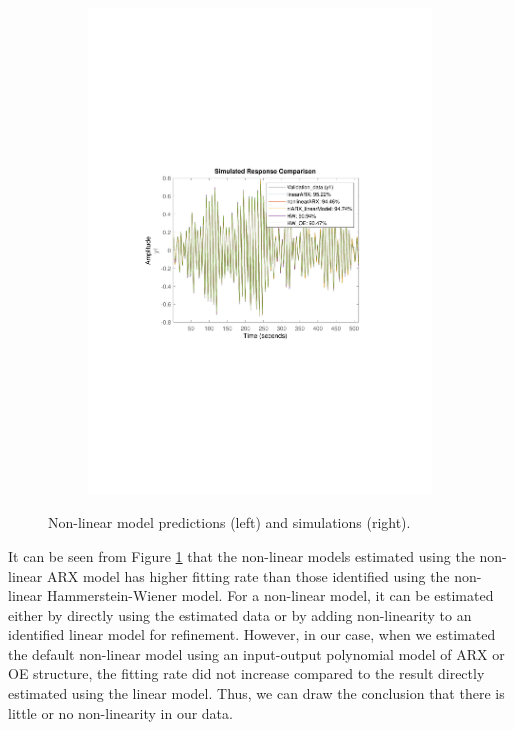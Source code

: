 \documentclass[]{article}
\begin{document}
\begin{figure}[ht]
\begin{subfigure}{.49\textwidth}
	\centering
	\includegraphics[trim= 10cm 8cm 10cm 8cm, scale=0.4]{figures/simulations_nl.pdf}
\end{subfigure}
\caption{Non-linear model predictions (left) and simulations (right).}
\label{fig:nonlinear}
\end{figure}

It can be seen from Figure \ref{fig:nonlinear} that the non-linear models estimated using the non-linear ARX model has higher fitting rate than those identified using the non-linear Hammerstein-Wiener model. For a non-linear model, it can be estimated either by directly using the estimated data or by adding non-linearity to an identified linear model for refinement. However, in our case, when we estimated the default non-linear model using an input-output polynomial model of ARX or OE structure, the fitting rate did not increase compared to the result directly estimated using the linear model. Thus, we can draw the conclusion that there is little or no non-linearity in our data.
\end{document}
